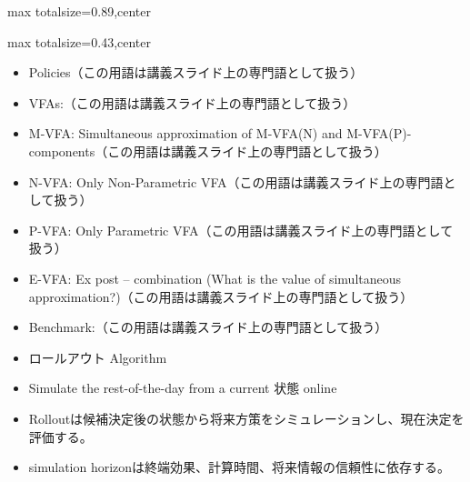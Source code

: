 \begin{minipage}[t]{0.58\textwidth}
\begin{adjustbox}{max totalsize={\textwidth}{0.89\textheight},center}
\begin{minipage}{\textwidth}
\end{minipage}
\end{adjustbox}
\end{minipage}


\clearpage
{}
\begin{minipage}[t]{0.405\textwidth}
\begin{adjustbox}{max totalsize={\textwidth}{0.43\textheight},center}
\begin{minipage}{\textwidth}\scriptsize
{}\begin{itemize}
\item Policies（この用語は講義スライド上の専門語として扱う）
\item VFAs:（この用語は講義スライド上の専門語として扱う）
\item M-VFA: Simultaneous approximation of M-VFA(N) and M-VFA(P)-components（この用語は講義スライド上の専門語として扱う）
\item N-VFA: Only Non-Parametric VFA（この用語は講義スライド上の専門語として扱う）
\item P-VFA: Only Parametric VFA（この用語は講義スライド上の専門語として扱う）
\item E-VFA: Ex post – combination (What is the value of simultaneous approximation?)（この用語は講義スライド上の専門語として扱う）
\item Benchmark:（この用語は講義スライド上の専門語として扱う）
\item ロールアウト Algorithm
\item Simulate the rest-of-the-day from a current 状態 online
\end{itemize}\begin{itemize}
\item Rolloutは候補決定後の状態から将来方策をシミュレーションし、現在決定を評価する。
\item simulation horizonは終端効果、計算時間、将来情報の信頼性に依存する。
\end{itemize}
\end{minipage}
\end{adjustbox}
\end{minipage}\hfill
